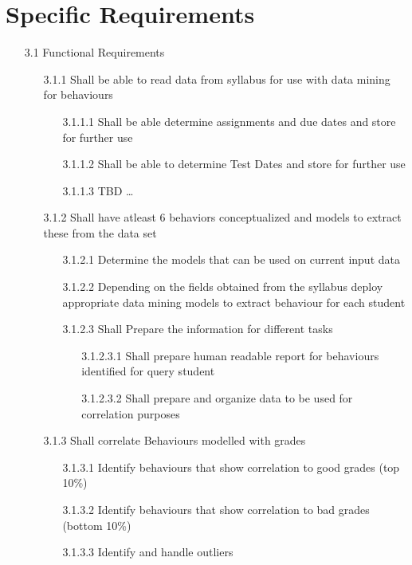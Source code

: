 \documentclass[12pt]{article}
\begin{document}
	\section{Specific Requirements} \label{reqs}
	\begin{enumerate}[itemsep=-1mm]
		\item [3.1] Functional Requirements
		\begin{enumerate}[itemsep=-1mm]
			\item[3.1.1] Shall be able to read data from syllabus for use with data mining for behaviours
			\begin{enumerate}[itemsep=-1mm]
				\item[3.1.1.1] Shall be able determine assignments and due dates and store for further use
				\item[3.1.1.2] Shall be able to determine Test Dates and store for further use
				\item[3.1.1.3] TBD \dots
			\end{enumerate}
			\item[3.1.2] Shall have atleast 6 behaviors conceptualized and models to extract these from the data set
			\begin{enumerate}[itemsep=-1mm]
				\item[3.1.2.1] Determine the models that can be used on current input data
				\item[3.1.2.2] Depending on the fields obtained from the syllabus deploy appropriate data mining models to extract behaviour for each student
				\item[3.1.2.3] Shall Prepare the information for different tasks
				\begin{enumerate}[itemsep=-1mm]
					\item[3.1.2.3.1] Shall prepare human readable report for behaviours identified for query student
					\item[3.1.2.3.2] Shall prepare and organize data to be used for correlation purposes
				\end{enumerate}
			\end{enumerate}
			\item[3.1.3] Shall correlate Behaviours modelled with grades
			\begin{enumerate}[itemsep=-1mm]
				\item[3.1.3.1] Identify behaviours that show correlation to good grades (top 10\%)
				\item[3.1.3.2] Identify behaviours that show correlation to bad grades (bottom 10\%)
				\item[3.1.3.3] Identify and handle outliers

\end{enumerate}
\end{enumerate}
\end{enumerate}
\end{document}
